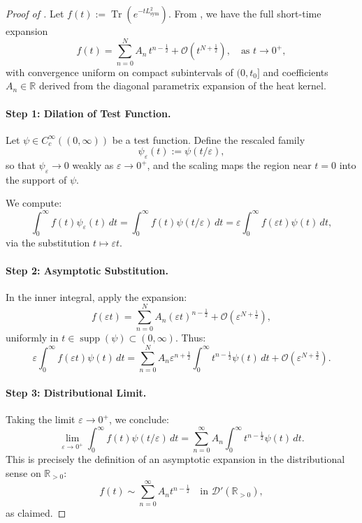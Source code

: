 \begin{proof}[Proof of ]
Let \( f(t) := \operatorname{Tr}(e^{-t L_{\mathrm{sym}}^2}) \). From , we have the full short-time expansion
\[
f(t) = \sum_{n=0}^N A_n \, t^{n - \frac{1}{2}} + \mathcal{O}(t^{N + \frac{1}{2}}), \quad \text{as } t \to 0^+,
\]
with convergence uniform on compact subintervals of \( (0, t_0] \) and coefficients \( A_n \in \mathbb{R} \) derived from the diagonal parametrix expansion of the heat kernel.

\paragraph{Step 1: Dilation of Test Function.}
Let \( \psi \in C_c^\infty((0, \infty)) \) be a test function. Define the rescaled family
\[
\psi_\varepsilon(t) := \psi(t/\varepsilon),
\]
so that \( \psi_\varepsilon \to 0 \) weakly as \( \varepsilon \to 0^+ \), and the scaling maps the region near \( t = 0 \) into the support of \( \psi \).

We compute:
\[
\int_0^\infty f(t) \psi_\varepsilon(t)\, dt
= \int_0^\infty f(t) \psi(t/\varepsilon)\, dt
= \varepsilon \int_0^\infty f(\varepsilon t) \psi(t)\, dt,
\]
via the substitution \( t \mapsto \varepsilon t \).

\paragraph{Step 2: Asymptotic Substitution.}
In the inner integral, apply the expansion:
\[
f(\varepsilon t) = \sum_{n=0}^N A_n (\varepsilon t)^{n - \frac{1}{2}} + \mathcal{O}(\varepsilon^{N + \frac{1}{2}}),
\]
uniformly in \( t \in \operatorname{supp}(\psi) \subset (0, \infty) \). Thus:
\[
\varepsilon \int_0^\infty f(\varepsilon t) \psi(t)\, dt
= \sum_{n=0}^N A_n \varepsilon^{n + \frac{1}{2}} \int_0^\infty t^{n - \frac{1}{2}} \psi(t)\, dt + \mathcal{O}(\varepsilon^{N + \frac{3}{2}}).
\]

\paragraph{Step 3: Distributional Limit.}
Taking the limit \( \varepsilon \to 0^+ \), we conclude:
\[
\lim_{\varepsilon \to 0^+} \int_0^\infty f(t) \psi(t/\varepsilon)\, dt
= \sum_{n=0}^\infty A_n \int_0^\infty t^{n - \frac{1}{2}} \psi(t)\, dt.
\]
This is precisely the definition of an asymptotic expansion in the distributional sense on \( \mathbb{R}_{>0} \):
\[
f(t) \sim \sum_{n=0}^\infty A_n t^{n - \frac{1}{2}} \quad \text{in } \mathcal{D}'(\mathbb{R}_{>0}),
\]
as claimed.
\end{proof}
